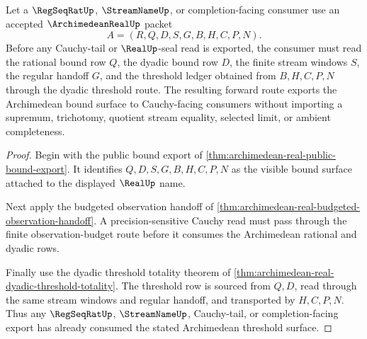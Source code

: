\begin{theorem}
\label{thm:archimedean-real-cauchy-threshold-forward-route}
Let a $\RegSeqRatUp$, $\StreamNameUp$, or completion-facing consumer use an accepted $\ArchimedeanRealUp$ packet
$$
A=(R,Q,D,S,G,B,H,C,P,N).
$$
Before any Cauchy-tail or $\RealUp$-seal read is exported, the consumer must read the rational bound row $Q$, the dyadic bound row $D$, the finite stream windows $S$, the regular handoff $G$, and the threshold ledger obtained from $B,H,C,P,N$ through the dyadic threshold route. The resulting forward route exports the Archimedean bound surface to Cauchy-facing consumers without importing a supremum, trichotomy, quotient stream equality, selected limit, or ambient completeness.
\end{theorem}
\begin{proof}
Begin with the public bound export of \autoref{thm:archimedean-real-public-bound-export}. It identifies $Q,D,S,G,B,H,C,P,N$ as the visible bound surface attached to the displayed $\RealUp$ name.

Next apply the budgeted observation handoff of \autoref{thm:archimedean-real-budgeted-observation-handoff}. A precision-sensitive Cauchy read must pass through the finite observation-budget route before it consumes the Archimedean rational and dyadic rows.

Finally use the dyadic threshold totality theorem of \autoref{thm:archimedean-real-dyadic-threshold-totality}. The threshold row is sourced from $Q,D$, read through the same stream windows and regular handoff, and transported by $H,C,P,N$. Thus any $\RegSeqRatUp$, $\StreamNameUp$, Cauchy-tail, or completion-facing export has already consumed the stated Archimedean threshold surface.
\end{proof}

